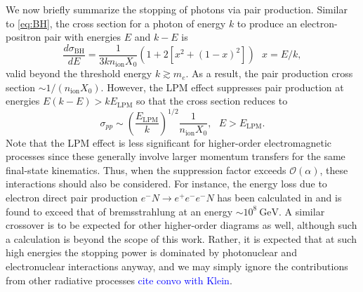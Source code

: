 \documentclass[twocolumn,showpacs,preprintnumbers,amsmath,amssymb,prd]{revtex4}
\newcommand{\OO}{\mathcal{O}}
\newcommand{\GeV}{\text{GeV}}
\def\r{\right)}
\def\l{\left(}
\begin{document}
\begin{appendices}
We now briefly summarize the stopping of photons via pair production. Similar to \eqref{eq:BH}, the cross section for a photon of energy $k$ to produce an electron-positron pair with energies $E$ and $k-E$ is
\begin{equation}
\label{eq:PP}
\frac{d \sigma_\text{BH}}{dE} = \frac{1}{3 k n_\text{ion} X_0} (1+ 2[x^2+ (1-x)^2]) ~~~ x = E/k,
\end{equation}
valid beyond the threshold energy $k \gtrsim m_e$. 
As a result, the pair production cross section $\sim 1/(n_\text{ion} X_0)$.
However, the LPM effect suppresses pair production at energies $E(k-E) > k E_\text{LPM}$ so that the cross section reduces to
\begin{equation}
\sigma_{pp} \sim \l\frac{E_\text{LPM}}{k} \r^{1/2} \frac{1}{n_\text{ion} X_0}, ~~~ E>E_\text{LPM}.
\end{equation}
Note that the LPM effect is less significant for higher-order electromagnetic processes since these generally involve larger momentum transfers for the same final-state kinematics.
Thus, when the suppression factor exceeds $\OO(\alpha)$, these interactions should also be considered.
For instance, the energy loss due to electron direct pair production $e^-N \to e^+ e^- e^- N$ has been calculated in \cite{Gerhardt:2010bj} and is found to exceed that of bremsstrahlung at an energy $\sim 10^{8} ~\GeV$. 
A similar crossover is to be expected for other higher-order diagrams as well, although such a calculation is beyond the scope of this work. 
Rather, it is expected that at such high energies the stopping power is dominated by photonuclear and electronuclear interactions anyway, and we may simply ignore the contributions from other radiative processes \textcolor{blue}{cite convo with Klein}. 


\end{appendices}
\end{document}
